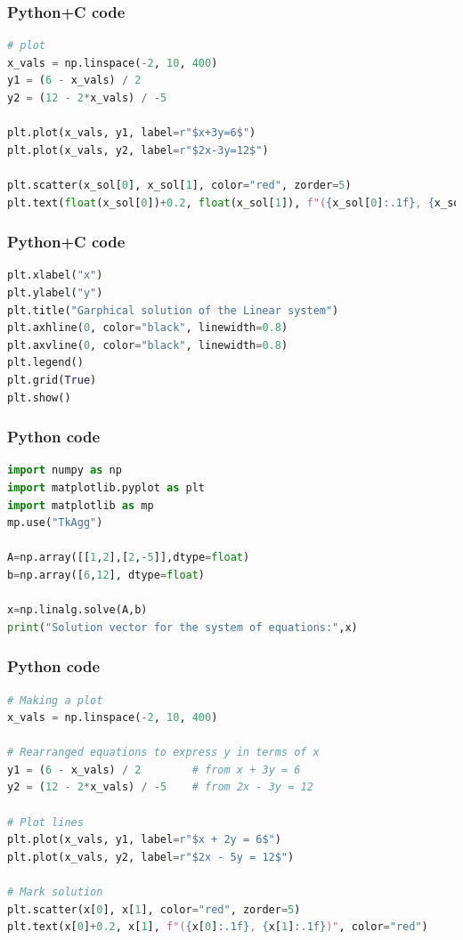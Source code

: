 \documentclass{beamer}
\begin{document}
\begin{frame}[fragile]
    \frametitle{Python+C code}

    \begin{lstlisting}[language=Python]
# plot
x_vals = np.linspace(-2, 10, 400)
y1 = (6 - x_vals) / 2
y2 = (12 - 2*x_vals) / -5

plt.plot(x_vals, y1, label=r"$x+3y=6$")
plt.plot(x_vals, y2, label=r"$2x-3y=12$")

plt.scatter(x_sol[0], x_sol[1], color="red", zorder=5)
plt.text(float(x_sol[0])+0.2, float(x_sol[1]), f"({x_sol[0]:.1f}, {x_sol[1]:.1f})", color="red")


    \end{lstlisting}
\end{frame}

\begin{frame}[fragile]
    \frametitle{Python+C code}

    \begin{lstlisting}[language=Python]
plt.xlabel("x")
plt.ylabel("y")
plt.title("Garphical solution of the Linear system")
plt.axhline(0, color="black", linewidth=0.8)
plt.axvline(0, color="black", linewidth=0.8)
plt.legend()
plt.grid(True)
plt.show()
    \end{lstlisting}
\end{frame}

\begin{frame}[fragile]
    \frametitle{Python code}
    \begin{lstlisting}[language=Python]
import numpy as np
import matplotlib.pyplot as plt
import matplotlib as mp
mp.use("TkAgg")

A=np.array([[1,2],[2,-5]],dtype=float)
b=np.array([6,12], dtype=float)

x=np.linalg.solve(A,b)
print("Solution vector for the system of equations:",x)
    \end{lstlisting}   
\end{frame}

\begin{frame}[fragile]
    \frametitle{Python code}
    \begin{lstlisting}[language=Python]
# Making a plot
x_vals = np.linspace(-2, 10, 400)

# Rearranged equations to express y in terms of x
y1 = (6 - x_vals) / 2        # from x + 3y = 6
y2 = (12 - 2*x_vals) / -5    # from 2x - 3y = 12

# Plot lines
plt.plot(x_vals, y1, label=r"$x + 2y = 6$")
plt.plot(x_vals, y2, label=r"$2x - 5y = 12$")

# Mark solution
plt.scatter(x[0], x[1], color="red", zorder=5)
plt.text(x[0]+0.2, x[1], f"({x[0]:.1f}, {x[1]:.1f})", color="red")
    \end{lstlisting}
    
\end{frame}
\end{document}
